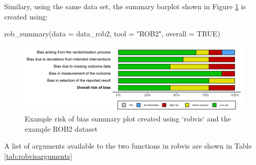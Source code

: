 \documentclass[a4paper, twoside]{templates/ociamthesis}
\newenvironment{Shaded}{\begin{snugshade}}{\end{snugshade}}
\newcommand{\AttributeTok}[1]{\textcolor[rgb]{0.77,0.63,0.00}{#1}}
\newcommand{\ConstantTok}[1]{\textcolor[rgb]{0.00,0.00,0.00}{#1}}
\newcommand{\FunctionTok}[1]{\textcolor[rgb]{0.00,0.00,0.00}{#1}}
\newcommand{\NormalTok}[1]{#1}
\newcommand{\StringTok}[1]{\textcolor[rgb]{0.31,0.60,0.02}{#1}}
\renewenvironment{Shaded}
{
  \vspace{4pt}%
  \begin{snugshade}%
}{%
  \end{snugshade}%
  \vspace{4pt}%
}
\begin{document}
Similary, using the same data set, the summary barplot shown in Figure \ref{fig:summaryplot} is created using:

\begin{Shaded}
\begin{Highlighting}[]
\FunctionTok{rob\_summary}\NormalTok{(}\AttributeTok{data =}\NormalTok{ data\_rob2,}
            \AttributeTok{tool =} \StringTok{"ROB2"}\NormalTok{, }
            \AttributeTok{overall =} \ConstantTok{TRUE}\NormalTok{)}
\end{Highlighting}
\end{Shaded}

\begin{figure}
\includegraphics[width=1\linewidth]{figures/sys-rev-tools/example-rob-summary-barplot} \caption{Example risk of bias summary plot created using `robvis` and the example ROB2 dataset}\label{fig:summaryplot}
\end{figure}

A list of arguments available to the two functions in robvis are shown in Table \ref{tab:robvisarguments}

\begingroup\fontsize{9}{11}\selectfont
\end{document}

